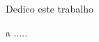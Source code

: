 \newpage

\vspace*{15cm}

{\large \hfill Dedico este trabalho}

{\large \hfill a .....}

\newpage

$ $
